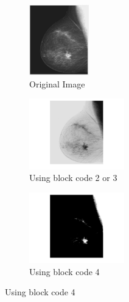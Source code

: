 \documentclass{article}
\begin{document}
\newpage
\begin{figure}[h]
\centering
    \begin{subfigure}[t]{0.3\textwidth}
        \centering
        \includegraphics[height=1.2in]{figure_2_3.jpg}
        \caption{Original Image}
    \end{subfigure}%
    \begin{subfigure}[t]{0.3\textwidth}
        \centering
        \includegraphics[height=1.2in]{figure_2_3_b.jpg}
        \caption{Using block code 2 or 3}
    \end{subfigure}%
    \begin{subfigure}[t]{0.3\textwidth}
        \centering
        \includegraphics[height=1.2in]{figure_2_3_c.jpg}
        \caption{Using block code 4}
    \end{subfigure}%
\end{figure}
\end{document}
